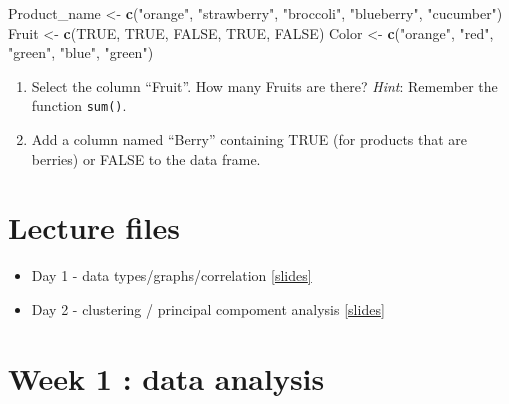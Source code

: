 \documentclass[
]{book}
\newenvironment{Shaded}{\begin{snugshade}}{\end{snugshade}}
\newcommand{\ConstantTok}[1]{\textcolor[rgb]{0.56,0.35,0.01}{#1}}
\newcommand{\FunctionTok}[1]{\textcolor[rgb]{0.13,0.29,0.53}{\textbf{#1}}}
\newcommand{\NormalTok}[1]{#1}
\newcommand{\OtherTok}[1]{\textcolor[rgb]{0.56,0.35,0.01}{#1}}
\newcommand{\StringTok}[1]{\textcolor[rgb]{0.31,0.60,0.02}{#1}}
\providecommand{\tightlist}{%
  \setlength{\itemsep}{0pt}\setlength{\parskip}{0pt}}
\begin{document}
\begin{Shaded}
\begin{Highlighting}[]
\NormalTok{Product\_name }\OtherTok{\textless{}{-}} \FunctionTok{c}\NormalTok{(}\StringTok{"orange"}\NormalTok{, }\StringTok{"strawberry"}\NormalTok{, }\StringTok{"broccoli"}\NormalTok{, }\StringTok{"blueberry"}\NormalTok{, }\StringTok{"cucumber"}\NormalTok{)}
\NormalTok{Fruit }\OtherTok{\textless{}{-}} \FunctionTok{c}\NormalTok{(}\ConstantTok{TRUE}\NormalTok{, }\ConstantTok{TRUE}\NormalTok{, }\ConstantTok{FALSE}\NormalTok{, }\ConstantTok{TRUE}\NormalTok{, }\ConstantTok{FALSE}\NormalTok{)}
\NormalTok{Color }\OtherTok{\textless{}{-}} \FunctionTok{c}\NormalTok{(}\StringTok{"orange"}\NormalTok{, }\StringTok{"red"}\NormalTok{, }\StringTok{"green"}\NormalTok{, }\StringTok{"blue"}\NormalTok{, }\StringTok{"green"}\NormalTok{)}
\end{Highlighting}
\end{Shaded}

\begin{enumerate}
\def\labelenumi{\arabic{enumi}.}
\setcounter{enumi}{1}
\item
  Select the column ``Fruit''.
  How many Fruits are there?
  \emph{Hint}: Remember the function \texttt{sum()}.
\item
  Add a column named ``Berry'' containing TRUE (for products that are berries) or FALSE to the data frame.
\end{enumerate}

\hypertarget{lecture-files}{%
\chapter{Lecture files}\label{lecture-files}}

\begin{itemize}
\tightlist
\item
  Day 1 - data types/graphs/correlation \href{./slides/GKBioinfo_week1_day1.pdf}{{[}slides{]}}
\item
  Day 2 - clustering / principal compoment analysis \href{./slides/GKBioinfo_week1_day2.pdf}{{[}slides{]}}
\end{itemize}

\hypertarget{week-1-data-analysis}{%
\chapter*{Week 1 : data analysis}\label{week-1-data-analysis}}
\end{document}
